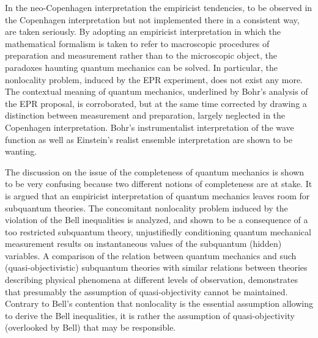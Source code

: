 \documentclass[12pt]{article}
\begin{document}
In the neo-Copenhagen interpretation the empiricist tendencies, to
be observed in the Copenhagen interpretation but not implemented
there in a consistent way, are taken seriously. By adopting an
empiricist interpretation in which the mathematical formalism is
taken to refer to macroscopic procedures of preparation and
measurement rather than to the microscopic object, the paradoxes
haunting quantum mechanics can be solved. In particular, the
nonlocality problem, induced by the EPR experiment, does not exist
any more. The contextual meaning of quantum mechanics, underlined
by Bohr's analysis of the EPR proposal, is corroborated, but at
the same time corrected by drawing a distinction between
measurement and preparation, largely neglected in the Copenhagen
interpretation. Bohr's instrumentalist interpretation of the wave
function as well as Einstein's realist ensemble interpretation are
shown to be wanting.

The discussion on the issue of the completeness of quantum
mechanics is shown to be very confusing because two different
notions of completeness are at stake. It is argued that an
empiricist interpretation of quantum mechanics leaves room for
subquantum theories. The concomitant nonlocality problem induced
by the violation of the Bell inequalities is analyzed, and shown
to be a consequence of a too restricted subquantum theory,
unjustifiedly conditioning quantum mechanical measurement results
on instantaneous values of the subquantum (hidden) variables. A
comparison of the relation between quantum mechanics and such
(quasi-objectivistic) subquantum theories with similar relations
between theories describing physical phenomena at different levels
of observation, demonstrates that presumably the assumption of
quasi-objectivity cannot be maintained. Contrary to Bell's
contention that nonlocality is the essential assumption allowing
to derive the Bell inequalities, it is rather the assumption of
quasi-objectivity (overlooked by Bell) that may be responsible.\\


\end{document}
